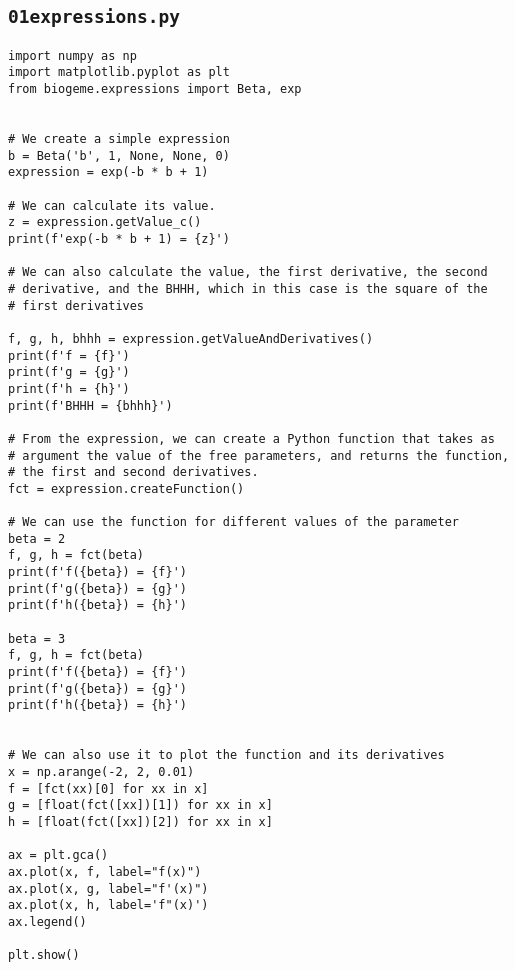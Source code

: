 \documentclass[12pt,a4paper]{article}
\begin{document}
\subsection{\lstinline$01expressions.py$}\label{sec:01expressions}
\begin{lstlisting}[style=numbers]
import numpy as np
import matplotlib.pyplot as plt
from biogeme.expressions import Beta, exp


# We create a simple expression
b = Beta('b', 1, None, None, 0)
expression = exp(-b * b + 1)

# We can calculate its value.
z = expression.getValue_c()
print(f'exp(-b * b + 1) = {z}')

# We can also calculate the value, the first derivative, the second
# derivative, and the BHHH, which in this case is the square of the
# first derivatives

f, g, h, bhhh = expression.getValueAndDerivatives()
print(f'f = {f}')
print(f'g = {g}')
print(f'h = {h}')
print(f'BHHH = {bhhh}')

# From the expression, we can create a Python function that takes as
# argument the value of the free parameters, and returns the function,
# the first and second derivatives.
fct = expression.createFunction()

# We can use the function for different values of the parameter
beta = 2
f, g, h = fct(beta)
print(f'f({beta}) = {f}')
print(f'g({beta}) = {g}')
print(f'h({beta}) = {h}')

beta = 3
f, g, h = fct(beta)
print(f'f({beta}) = {f}')
print(f'g({beta}) = {g}')
print(f'h({beta}) = {h}')


# We can also use it to plot the function and its derivatives
x = np.arange(-2, 2, 0.01)
f = [fct(xx)[0] for xx in x]
g = [float(fct([xx])[1]) for xx in x]
h = [float(fct([xx])[2]) for xx in x]

ax = plt.gca()
ax.plot(x, f, label="f(x)")
ax.plot(x, g, label="f'(x)")
ax.plot(x, h, label='f"(x)')
ax.legend()

plt.show()
\end{lstlisting}
\end{document}
